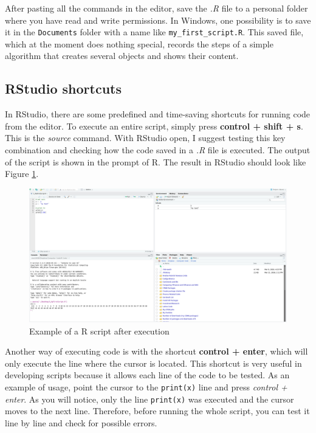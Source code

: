 \documentclass[
  12pt,
]{book}
\begin{document}
After pasting all the commands in the editor, save the \emph{.R} file to a personal folder where you have read and write permissions. In Windows, one possibility is to save it in the \texttt{Documents} folder with a name like \texttt{\textquotesingle{}my\_first\_script.R\textquotesingle{}}. This saved file, which at the moment does nothing special, records the steps of a simple algorithm that creates several objects and shows their content.

\hypertarget{rstudio-shortcuts}{%
\subsection{RStudio shortcuts}\label{rstudio-shortcuts}}

In RStudio, there are some predefined and time-saving shortcuts for running code from the editor. To execute an entire script, simply press \textbf{control + shift + s}. This is the \emph{source} command. With RStudio open, I suggest testing this key combination and checking how the code saved in a \emph{.R} file is executed. The output of the script is shown in the prompt of R. The result in RStudio should look like Figure \ref{fig:example-script-source}. 

\begin{figure}[!htbp]

{\centering \includegraphics[width=1\linewidth]{figs/RStudio_example_script_source} 

}

\caption{Example of a R script after execution}\label{fig:example-script-source}
\end{figure}

Another way of executing code is with the shortcut \textbf{control + enter}, which will only execute the line where the cursor is located. This shortcut is very useful in developing scripts because it allows each line of the code to be tested. As an example of usage, point the cursor to the \texttt{print(x)} line and press \emph{control + enter}. As you will notice, only the line \texttt{print(x)} was executed and the cursor moves to the next line. Therefore, before running the whole script, you can test it line by line and check for possible errors.
\end{document}
